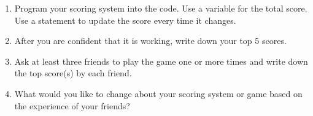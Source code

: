 \begin{description}
\begin{enumerate}
\tightframe{\vspace{1.5in} \ }

	\item Program your scoring system into the code. Use a variable  for the total score. Use a  statement to update the score every time it changes.
		
	\item After you are confident that it is working, write down your top 5 scores.

\tightframe{\vspace{0.75in} \ }
	
	\item Ask at least three friends to play the game one or more times and write down the top score(s) by each friend.

\tightframe{\vspace{0.75in} \ }

	\item What would you like to change about your scoring system or game based on the experience of your friends?

\end{enumerate}

\end{description}
